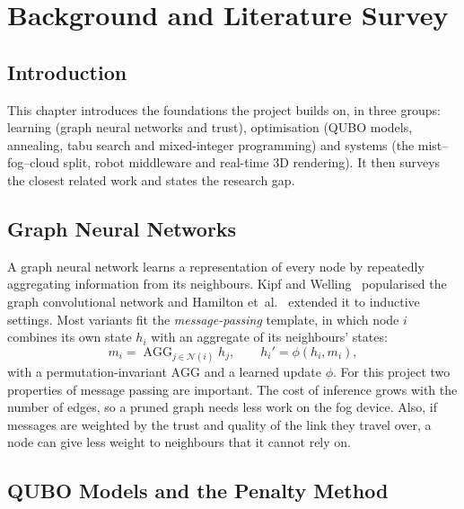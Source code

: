 \chapter{Background and Literature Survey}
\label{ch:background}

\section{Introduction}

This chapter introduces the foundations the project builds on, in three
groups: learning (graph neural networks and trust), optimisation (QUBO models,
annealing, tabu search and mixed-integer programming) and systems (the
mist--fog--cloud split, robot middleware and real-time 3D rendering). It then
surveys the closest related work and states the research gap.

\section{Graph Neural Networks}

A graph neural network learns a representation of every node by repeatedly
aggregating information from its neighbours. Kipf and Welling~\cite{kipf2017}
popularised the graph convolutional network and Hamilton
et~al.~\cite{hamilton2017} extended it to inductive settings. Most variants fit
the \emph{message-passing} template, in which node $i$ combines its own state
$h_i$ with an aggregate of its neighbours' states:
\begin{equation}
m_i=\mathop{\mathrm{AGG}}_{j\in\mathcal N(i)} h_j,\qquad h_i'=\phi(h_i,m_i),
\label{eq:bg:mp}
\end{equation}
with a permutation-invariant $\mathrm{AGG}$ and a learned update $\phi$. For
this project two properties of message passing are important. The cost of
inference grows with the number of edges, so a pruned graph needs less work on
the fog device. Also, if messages are weighted by the trust and quality of the
link they travel over, a node can give less weight to neighbours that it cannot
rely on.

\section{QUBO Models and the Penalty Method}

